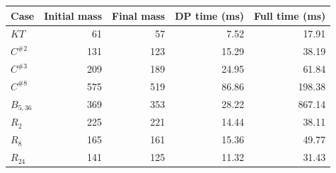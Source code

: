 \begin{tabular}{@{}lrrrr@{}}
\toprule
Case & Initial mass & Final mass & DP time (ms) & Full time (ms)\\\midrule
$KT$ & 61 & 57 & 7.52 & 17.91\\
$C^{\#2}$ & 131 & 123 & 15.29 & 38.19\\
$C^{\#3}$ & 209 & 189 & 24.95 & 61.84\\
$C^{\#8}$ & 575 & 519 & 86.86 & 198.38\\
$B_{5,36}$ & 369 & 353 & 28.22 & 867.14\\
$R_{2}$ & 225 & 221 & 14.44 & 38.11\\
$R_{8}$ & 165 & 161 & 15.36 & 49.77\\
$R_{24}$ & 141 & 125 & 11.32 & 31.43\\
\bottomrule
\end{tabular}
